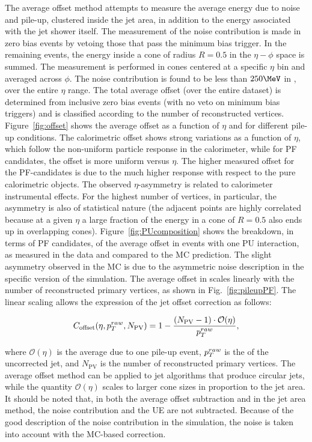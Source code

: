 The average offset method attempts to measure the average energy due to noise and pile-up, clustered inside the jet area, in addition to the energy associated with the jet shower itself. The measurement of the noise contribution is made in zero bias events by vetoing those that pass the minimum bias trigger. In the remaining events, the energy inside a cone of radius $R=0.5$ in the $\eta-\phi$ space is summed. The measurement is performed in cones centered at a specific $\eta$ bin and averaged across $\phi$. The noise contribution is found to be less than $250\MeV$ in \pt, over the entire $\eta$ range. The total average offset (over the entire dataset) is determined from inclusive zero bias events (with no veto on minimum bias triggers) and is classified according to the number of reconstructed vertices. Figure~\ref{fig:offset} shows the average offset \pt as a function of $\eta$ and for different pile-up conditions. The calorimetric offset \pt shows strong variations as a function of $\eta$, which follow the non-uniform particle response in the calorimeter, while for PF candidates, the offset \pt is more uniform versus $\eta$. The higher measured offset \pt for the PF-candidates is due to the much higher response with respect to the pure calorimetric objects. The observed $\eta$-asymmetry is related to calorimeter instrumental effects. For the highest number of vertices, in particular, the asymmetry is also of statistical nature (the adjacent points are highly correlated because at a given $\eta$ a large fraction of the energy in a cone of $R=0.5$ also ends up in overlapping cones). Figure~\ref{fig:PUcomposition} shows the breakdown, in terms of PF candidates, of the average offset \pt in events with one PU interaction, as measured in the data and compared to the MC prediction. The slight asymmetry observed in the MC is due to the asymmetric noise description in the specific version of the simulation. The average offset in \pt scales linearly with the number of reconstructed primary vertices, as shown in Fig.~\ref{fig:pileupPF}. The linear scaling allows the expression of the jet offset correction as follows:

\begin{equation}
  C_\text{offset}(\eta,p_{{T}}^{raw},N_\text{PV}) = 1-\frac{(N_\text{PV}-1)\cdot\mathcal{O}(\eta)}{p_{{T}}^{raw}},
\end{equation}

where $\mathcal{O}(\eta)$ is the average \pt due to one pile-up event, $p_{{T}}^{raw}$ is the \pt of the uncorrected jet, and $N_\text{PV}$ is the number of reconstructed primary vertices. The average offset method can be applied to jet algorithms that produce circular jets, while the quantity $\mathcal{O}(\eta)$ scales to larger cone sizes in proportion to the jet area. It should be noted that, in both the average offset subtraction and in the jet area method, the noise contribution and the UE are not subtracted. Because of the good description of the noise contribution in the simulation, the noise is taken into account with the MC-based correction.

